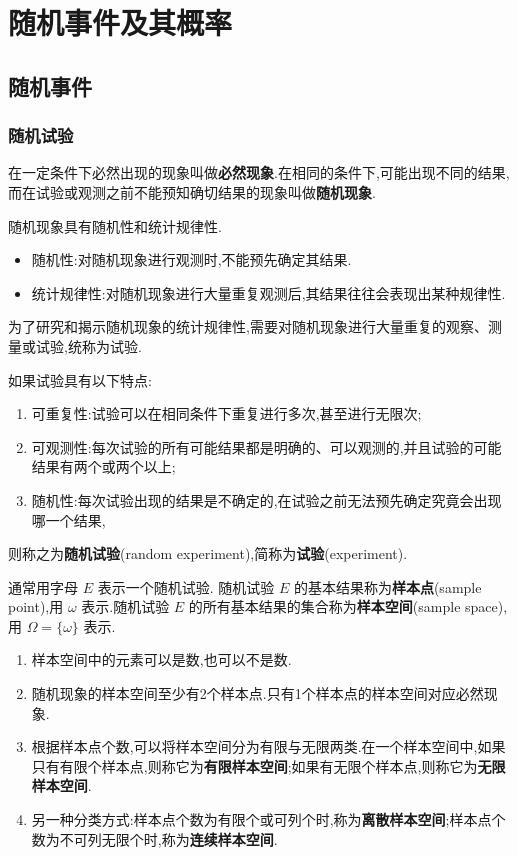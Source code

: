 
\chapter{随机事件及其概率}
\thispagestyle{plain}

\section{随机事件}

\subsection{随机试验}

在一定条件下必然出现的现象叫做\textbf{必然现象}.在相同的条件下,可能出现不同的结果,而在试验或观测之前不能预知确切结果的现象叫做\textbf{随机现象}.

随机现象具有随机性和统计规律性.

\begin{itemize}
    \item 随机性:对随机现象进行观测时,不能预先确定其结果.
    \item 统计规律性:对随机现象进行大量重复观测后,其结果往往会表现出某种规律性.
\end{itemize}

为了研究和揭示随机现象的统计规律性,需要对随机现象进行大量重复的观察、测量或试验,统称为试验.

如果试验具有以下特点:
\begin{enumerate}
    \item 可重复性:试验可以在相同条件下重复进行多次,甚至进行无限次;
    \item 可观测性:每次试验的所有可能结果都是明确的、可以观测的,并且试验的可能结果有两个或两个以上;
    \item 随机性:每次试验出现的结果是不确定的,在试验之前无法预先确定究竟会出现哪一个结果,
\end{enumerate}
则称之为\textbf{随机试验}(random experiment),简称为\textbf{试验}(experiment).

通常用字母 $E$ 表示一个随机试验. 随机试验 $E$ 的基本结果称为\textbf{样本点}(sample point),用 $\omega$ 表示.随机试验 $E$ 的所有基本结果的集合称为\textbf{样本空间}(sample space),用 $\varOmega = \{ \omega \}$ 表示.

\begin{note}
    \begin{enumerate}
        \item 样本空间中的元素可以是数,也可以不是数.
        \item 随机现象的样本空间至少有2个样本点.只有1个样本点的样本空间对应必然现象.
        \item 根据样本点个数,可以将样本空间分为有限与无限两类.在一个样本空间中,如果只有有限个样本点,则称它为\textbf{有限样本空间};如果有无限个样本点,则称它为\textbf{无限样本空间}.
        \item 另一种分类方式:样本点个数为有限个或可列个时,称为\textbf{离散样本空间};样本点个数为不可列无限个时,称为\textbf{连续样本空间}.
    \end{enumerate}
\end{note}

